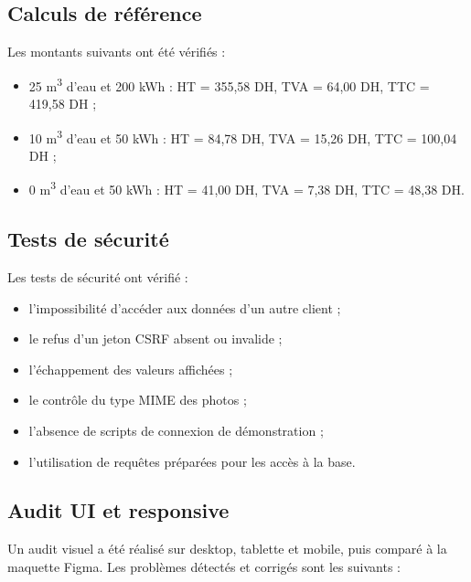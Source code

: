 \subsection{Calculs de référence}

Les montants suivants ont été vérifiés :

\begin{itemize}[leftmargin=*]
  \item 25 m\textsuperscript{3} d'eau et 200 kWh : HT = 355,58 DH, TVA = 64,00 DH, TTC = 419,58 DH ;
  \item 10 m\textsuperscript{3} d'eau et 50 kWh : HT = 84,78 DH, TVA = 15,26 DH, TTC = 100,04 DH ;
  \item 0 m\textsuperscript{3} d'eau et 50 kWh : HT = 41,00 DH, TVA = 7,38 DH, TTC = 48,38 DH.
\end{itemize}

\subsection{Tests de sécurité}

Les tests de sécurité ont vérifié :

\begin{itemize}[leftmargin=*]
  \item l'impossibilité d'accéder aux données d'un autre client ;
  \item le refus d'un jeton CSRF absent ou invalide ;
  \item l'échappement des valeurs affichées ;
  \item le contrôle du type MIME des photos ;
  \item l'absence de scripts de connexion de démonstration ;
  \item l'utilisation de requêtes préparées pour les accès à la base.
\end{itemize}

\subsection{Audit UI et responsive}

Un audit visuel a été réalisé sur desktop, tablette et mobile, puis comparé à la maquette Figma. Les problèmes détectés et corrigés sont les suivants :

